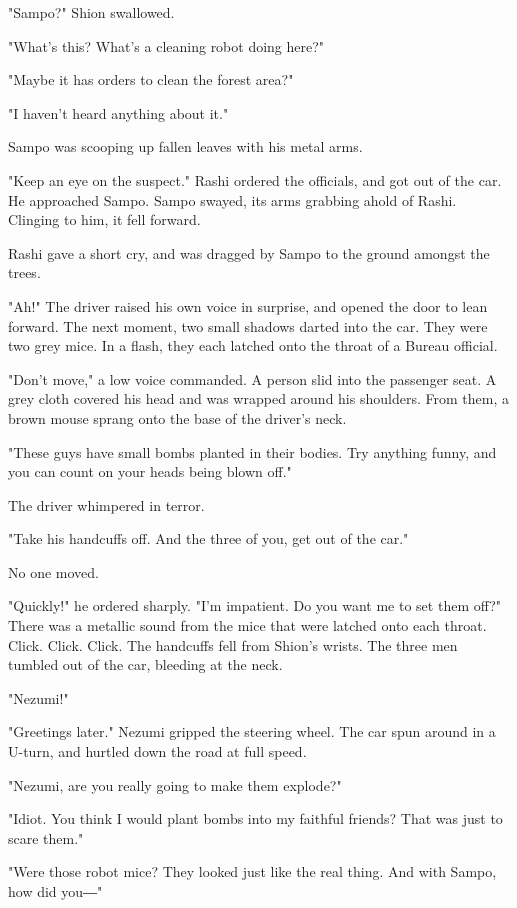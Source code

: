 "Sampo?" Shion swallowed.

"What's this? What's a cleaning robot doing here?"

"Maybe it has orders to clean the forest area?"

"I haven't heard anything about it."

Sampo was scooping up fallen leaves with his metal arms.

"Keep an eye on the suspect." Rashi ordered the officials, and got out
of the car. He approached Sampo. Sampo swayed, its arms grabbing ahold
of Rashi. Clinging to him, it fell forward.

Rashi gave a short cry, and was dragged by Sampo to the ground amongst
the trees.

"Ah!" The driver raised his own voice in surprise, and opened the door
to lean forward. The next moment, two small shadows darted into the car.
They were two grey mice. In a flash, they each latched onto the throat
of a Bureau official.

"Don't move," a low voice commanded. A person slid into the passenger
seat. A grey cloth covered his head and was wrapped around his
shoulders. From them, a brown mouse sprang onto the base of the driver's
neck.

"These guys have small bombs planted in their bodies. Try anything
funny, and you can count on your heads being blown off."

The driver whimpered in terror.

"Take his handcuffs off. And the three of you, get out of the car."

No one moved.

"Quickly!" he ordered sharply. "I'm impatient. Do you want me to set
them off?" There was a metallic sound from the mice that were latched
onto each throat. Click. Click. Click. The handcuffs fell from Shion's
wrists. The three men tumbled out of the car, bleeding at the neck.

"Nezumi!"

"Greetings later." Nezumi gripped the steering wheel. The car spun
around in a U-turn, and hurtled down the road at full speed.

"Nezumi, are you really going to make them explode?"

"Idiot. You think I would plant bombs into my faithful friends? That was
just to scare them."

"Were those robot mice? They looked just like the real thing. And with
Sampo, how did you―"

